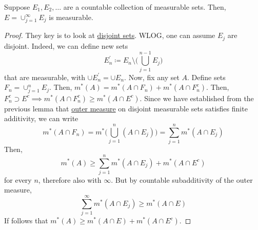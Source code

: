   \begin{theorem}
    \label{thm:countable-unions-are-measurable}
    Suppose $E_1, E_2, \ldots$ are a countable collection of measurable sets. Then, $E = \cup_{j=1}^\infty E_j$ is measurable. 
  \end{theorem}
  \begin{proof}
    They key is to look at \hyperref[st-def:disjoint-sets]{disjoint sets}. WLOG, one can assume $E_j$ are disjoint. Indeed, we can define new sets
    \begin{equation}
      E_n^\prime \coloneqq E_n \setminus \bigg( \bigcup_{j=1}^{n-1} E_j \bigg) 
    \end{equation}
    that are measurable, with $\cup E_n^\prime = \cup E_n$. Now, fix any set $A$. Define sets $F_n = \cup_{j=1}^n E_j$. Then, $m^\ast (A) = m^\ast (A \cap F_n) + m^\ast (A \cap F_n^c)$. Then, $F_n^c \supset E^c \implies m^\ast (A \cap F_n^c) \geq m^\ast (A \cap E^c)$. Since we have established from the previous lemma that \hyperref[def:outer-measure]{outer measure} on disjoint measurable sets satisfies finite additivity, we can write
    \begin{equation}
      m^\ast (A \cap F_n) = m^\ast \bigg( \bigcup_{j=1}^n (A \cap E_j) \bigg) = \sum_{j=1}^n m^\ast (A \cap E_j) 
    \end{equation}
    Then, 
    \begin{equation}
      m^\ast (A) \geq \sum_{j=1}^n m^\ast (A \cap E_j) + m^\ast (A \cap E^c) 
    \end{equation}
    for every $n$, therefore also with $\infty$. But by countable subadditivity of the outer measure, 
    \begin{equation}
      \sum_{j=1}^\infty m^\ast (A \cap E_j) \geq m^\ast (A \cap E)
    \end{equation}
    If follows that $m^\ast (A) \geq m^\ast (A \cap E) + m^\ast (A \cap E^c)$. 
  \end{proof}
